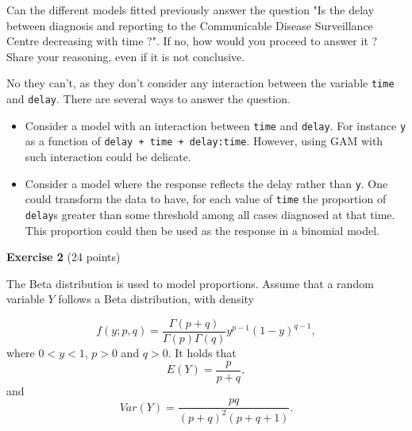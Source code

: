 \documentclass[11pt,a4paper%
addpoints, 
]{exam}
\begin{document}
\begin{questions}
\question[2] Can the different models fitted previously answer the question "Is the delay between diagnosis and reporting to the Communicable Disease Surveillance Centre decreasing with time ?". If no, how would you proceed to answer it ? Share your reasoning, even if it is not conclusive.
\begin{solution}
	No they can't, as they don't consider any interaction between the variable \texttt{time} and \texttt{delay}. There are several ways to answer the question. 
	\begin{itemize}
		\item Consider a model with an interaction between \texttt{time} and \texttt{delay}. For instance \texttt{y} as a function of \texttt{delay + time + delay:time}. However, using GAM with such interaction could be delicate.
		\item Consider a model where the response reflects the delay rather than \texttt{y}. One could transform the data to have, for each value of \texttt{time} the proportion of \texttt{delay}s greater than some threshold among all cases diagnosed at that time. This proportion could then be used as the response in a binomial model.
	\end{itemize}
\end{solution}





\end{questions}

\clearpage
{\Large \textbf{Exercise 2} \hfill (24 points)}

\bigskip 

The Beta distribution is used to model proportions.  Assume that a random variable $Y$ follows a Beta distribution, with density

$$f(y; p,q) = \frac{\Gamma(p+q)}{\Gamma(p) \Gamma(q)}  y^{p-1} (1-y)^{q-1},$$
where $0<y<1$, $p>0$ and $q>0$. It holds that
$$E(Y) = \frac{p}{p+q},$$
and 
$$Var(Y) = \frac{pq}{(p+q)^2 (p+q+1)}.$$
\end{document}
